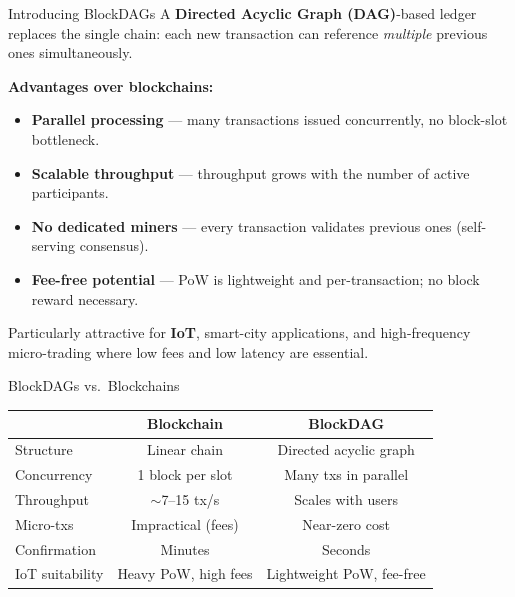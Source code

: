 \documentclass[aspectratio=169]{beamer}
\begin{document}
\begin{frame}{Introducing BlockDAGs}
  A \textbf{Directed Acyclic Graph (DAG)}-based ledger replaces the single chain: each new transaction can reference \emph{multiple} previous ones simultaneously.

  \bigskip
  \textbf{Advantages over blockchains:}
  \begin{itemize}
    \item \textbf{Parallel processing} --- many transactions issued concurrently, no block-slot bottleneck.
    \item \textbf{Scalable throughput} --- throughput grows with the number of active participants.
    \item \textbf{No dedicated miners} --- every transaction validates previous ones (self-serving consensus).
    \item \textbf{Fee-free potential} --- PoW is lightweight and per-transaction; no block reward necessary.
  \end{itemize}

  \bigskip
  Particularly attractive for \textbf{IoT}, smart-city applications, and high-frequency micro-trading where low fees and low latency are essential.
\end{frame}

\begin{frame}{BlockDAGs vs.\ Blockchains}
  \centering
  \begin{tabular}{@{} l c c @{}}
    \toprule
    & \textbf{Blockchain} & \textbf{BlockDAG} \\
    \midrule
    Structure        & Linear chain           & Directed acyclic graph \\
    Concurrency      & 1 block per slot       & Many txs in parallel \\
    Throughput       & $\sim$7--15 tx/s       & Scales with users \\
    Micro-txs        & Impractical (fees)     & Near-zero cost \\
    Confirmation     & Minutes                & Seconds \\
    IoT suitability  & Heavy PoW, high fees   & Lightweight PoW, fee-free \\
    \bottomrule
  \end{tabular}
\end{frame}
\end{document}
